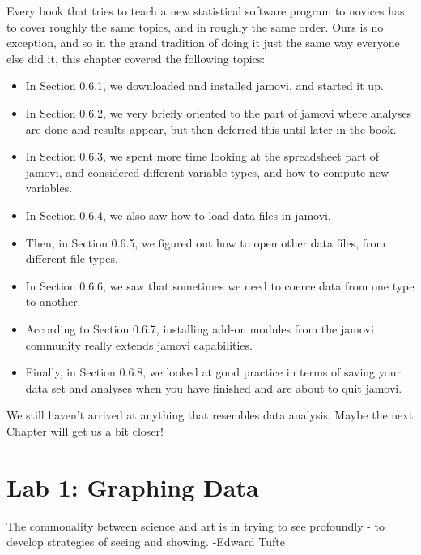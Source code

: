 \documentclass[
]{book}
\providecommand{\tightlist}{%
  \setlength{\itemsep}{0pt}\setlength{\parskip}{0pt}}
\begin{document}
Every book that tries to teach a new statistical software program to novices has to cover roughly the same topics, and in roughly the same order. Ours is no exception, and so in the grand tradition of doing it just the same way everyone else did it, this chapter covered the following topics:

\begin{itemize}
\tightlist
\item
  In Section 0.6.1, we downloaded and installed jamovi, and started it up.
\item
  In Section 0.6.2, we very briefly oriented to the part of jamovi where analyses are done and results appear, but then deferred this until later in the book.
\item
  In Section 0.6.3, we spent more time looking at the spreadsheet part of jamovi, and considered different variable types, and how to compute new variables.
\item
  In Section 0.6.4, we also saw how to load data files in jamovi.
\item
  Then, in Section 0.6.5, we figured out how to open other data files, from different file types.
\item
  In Section 0.6.6, we saw that sometimes we need to coerce data from one type to another.
\item
  According to Section 0.6.7, installing add-on modules from the jamovi community really extends jamovi capabilities.
\item
  Finally, in Section 0.6.8, we looked at good practice in terms of saving your data set and analyses when you have finished and are about to quit jamovi.
\end{itemize}

\noindent
We still haven't arrived at anything that resembles data analysis. Maybe the next Chapter will get us a bit closer!

\hypertarget{lab-1-graphing-data}{%
\chapter{Lab 1: Graphing Data}\label{lab-1-graphing-data}}

{
The commonality between science and art is in trying to see profoundly - to develop strategies of seeing and showing.
-Edward Tufte
}
\end{document}

